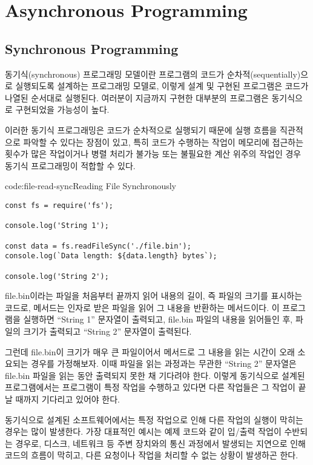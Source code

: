\section{Asynchronous Programming}\label{sect:asynchronous-programming}

\subsection*{Synchronous Programming}

동기식(synchronous) 프로그래밍 모델이란 프로그램의 코드가 순차적(sequentially)으로 실행되도록 설계하는 프로그래밍 모델로, 이렇게 설계 및 구현된 프로그램은 코드가 나열된 순서대로 실행된다. 여러분이 지금까지 구현한 대부분의 프로그램은 동기식으로 구현되었을 가능성이 높다. 

이러한 동기식 프로그래밍은 코드가 순차적으로 실행되기 때문에 실행 흐름을 직관적으로 파악할 수 있다는 장점이 있고, 특히 코드가 수행하는 작업이 메모리에 접근하는 횟수가 많은 작업이거나 병렬 처리가 불가능 또는 불필요한 계산 위주의 작업인 경우 동기식 프로그래밍이 적합할 수 있다.

\begin{codeenv}{code:file-read-sync}{Reading File Synchronously}\begin{verbatim}
const fs = require('fs');

console.log('String 1');

const data = fs.readFileSync('./file.bin');
console.log(`Data length: ${data.length} bytes`);

console.log('String 2');
\end{verbatim}
\end{codeenv}

\는 file.bin이라는 파일을 처음부터 끝까지 읽어 내용의 길이, 즉 파일의 크기를 표시하는 코드로,  메서드는 인자로 받은 파일을 읽어 그 내용을 반환하는 메서드이다. 이 프로그램을 실행하면 ``String 1'' 문자열이 출력되고, file.bin 파일의 내용을 읽어들인 후, 파일의 크기가 출력되고 ``String 2'' 문자열이 출력된다.

그런데 file.bin이 크기가 매우 큰 파일이어서  메서드로 그 내용을 읽는 시간이 오래 소요되는 경우를 가정해보자. 이때 파일을 읽는 과정과는 무관한 ``String 2'' 문자열은 file.bin 파일을 읽는 동안 출력되지 못한 채 기다려야 한다. 이렇게 동기식으로 설계된 프로그램에서는 프로그램이 특정 작업을 수행하고 있다면 다른 작업들은 그 작업이 끝날 때까지 기다리고 있어야 한다.

동기식으로 설계된 소프트웨어에서는 특정 작업으로 인해 다른 작업의 실행이 막히는 경우는 많이 발생한다. 가장 대표적인 예시는 예제 코드와 같이 입/출력 작업이 수반되는 경우로, 디스크, 네트워크 등 주변 장치와의 통신 과정에서 발생되는 지연으로 인해 코드의 흐름이 막히고, 다른 요청이나 작업을 처리할 수 없는 상황이 발생하곤 한다. 

